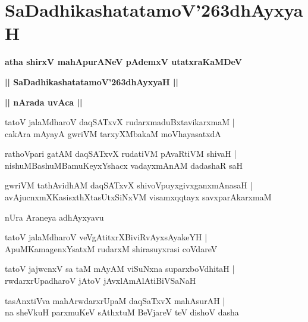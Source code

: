 \documentclass[twoside,12pt,openright]{book}
\def\S{\char'263}
\newcounter{shloka}[chapter]
\def\uvaca#1{\centerline{{\large\textbf{#1}}}}
\begin{document}
\chapter{SaDadhikashatatamoV\S dhAyxyaH}

\begin{center}
{\LARGE\bfseries atha shirxV mahApurANeV pAdemxV utatxraKaMDeV}
\end{center}

\begin{center}
{\LARGE\bfseries || SaDadhikashatatamoV\S dhAyxyaH || }
\end{center}

\uvaca{|| nArada uvAca ||}

\begin{shloka}%
tatoV jalaMdharoV daqSATxvX rudarxmaduBxtavikarxmaM |\\
cakAra mAyayA gwriVM tarxyXMbakaM moVhayasatxdA 
\end{shloka}

\begin{shloka}%
rathoVpari gatAM daqSATxvX rudatiVM pAvaRtiVM shivaH |\\
nishuMBashuMBamuKeyxYshacx vadayxmAnAM dadashaR saH 
\end{shloka}

\begin{shloka}%
gwriVM tathAvidhAM daqSATxvX shivoVpuyxgivxganxmAnasaH |\\
avAjucnxmXKasisxthXtasUtxSiNxVM visamxqqtayx savxparAkarxmaM 
\end{shloka}

\begin{center}
nUra Araneya adhAyxyavu
\end{center}

\begin{shloka}%
tatoV jalaMdharoV veVgAtitxrXBiviRvAyxsAyakeYH |\\
ApuMKamagenxYsatxM rudarxM shirasuyxrasi coVdareV 
\end{shloka}

\begin{shloka}%
tatoV jajwcnxV sa taM mAyAM viSuNxna suparxboVdhitaH |\\
rwdarxrUpadharoV jAtoV jAvxlAmAlAtiBiVSaNaH 
\end{shloka}

\begin{shloka}%
tasAnxtiVva mahArwdarxrUpaM daqSaTxvX mahAsurAH |\\
na sheVkuH parxmuKeV sAthxtuM BeVjareV teV dishoV dasha 
\end{shloka}
\end{document}
